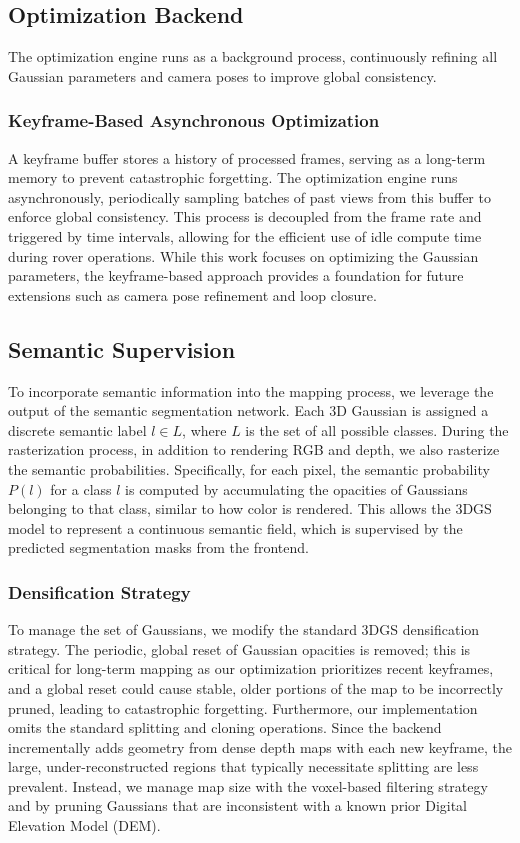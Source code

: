 \subsection{Optimization Backend}
The optimization engine runs as a background process, continuously refining all Gaussian parameters and camera poses to improve global consistency.

\subsubsection{Keyframe-Based Asynchronous Optimization}
A keyframe buffer stores a history of processed frames, serving as a long-term memory to prevent catastrophic forgetting. The optimization engine runs asynchronously, periodically sampling batches of past views from this buffer to enforce global consistency. This process is decoupled from the frame rate and triggered by time intervals, allowing for the efficient use of idle compute time during rover operations. While this work focuses on optimizing the Gaussian parameters, the keyframe-based approach provides a foundation for future extensions such as camera pose refinement and loop closure.

\subsection{Semantic Supervision}
To incorporate semantic information into the mapping process, we leverage the output of the semantic segmentation network. Each 3D Gaussian is assigned a discrete semantic label $l \in L$, where $L$ is the set of all possible classes. During the rasterization process, in addition to rendering RGB and depth, we also rasterize the semantic probabilities. Specifically, for each pixel, the semantic probability $P(l)$ for a class $l$ is computed by accumulating the opacities of Gaussians belonging to that class, similar to how color is rendered. This allows the 3DGS model to represent a continuous semantic field, which is supervised by the predicted segmentation masks from the frontend.

\subsubsection{Densification Strategy}
To manage the set of Gaussians, we modify the standard 3DGS densification strategy. The periodic, global reset of Gaussian opacities is removed; this is critical for long-term mapping as our optimization prioritizes recent keyframes, and a global reset could cause stable, older portions of the map to be incorrectly pruned, leading to catastrophic forgetting. Furthermore, our implementation omits the standard splitting and cloning operations. Since the backend incrementally adds geometry from dense depth maps with each new keyframe, the large, under-reconstructed regions that typically necessitate splitting are less prevalent. Instead, we manage map size with the voxel-based filtering strategy and by pruning Gaussians that are inconsistent with a known prior Digital Elevation Model (DEM).

